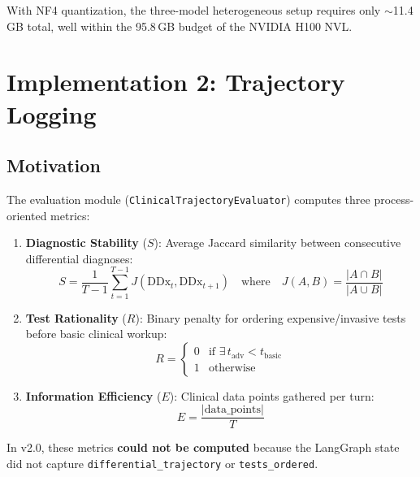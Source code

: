 \documentclass[12pt, a4paper]{article}
\begin{document}
With NF4 quantization, the three-model heterogeneous setup requires only
$\sim$11.4\,GB total, well within the 95.8\,GB budget of the NVIDIA H100 NVL.

\section{Implementation 2: Trajectory Logging}
\label{sec:trajectory}

\subsection{Motivation}

The evaluation module (\texttt{ClinicalTrajectoryEvaluator}) computes three
process-oriented metrics:

\begin{enumerate}
    \item \textbf{Diagnostic Stability} ($S$): Average Jaccard similarity
    between consecutive differential diagnoses:
    \begin{equation}
        S = \frac{1}{T-1} \sum_{t=1}^{T-1} J(\text{DDx}_t, \text{DDx}_{t+1})
        \quad\text{where}\quad J(A,B) = \frac{|A \cap B|}{|A \cup B|}
    \end{equation}

    \item \textbf{Test Rationality} ($R$): Binary penalty for ordering
    expensive/invasive tests before basic clinical workup:
    \begin{equation}
        R = \begin{cases} 0 & \text{if } \exists\, t_{\text{adv}} < t_{\text{basic}} \\ 1 & \text{otherwise} \end{cases}
    \end{equation}

    \item \textbf{Information Efficiency} ($E$): Clinical data points
    gathered per turn:
    \begin{equation}
        E = \frac{|\text{data\_points}|}{T}
    \end{equation}
\end{enumerate}

In v2.0, these metrics \textbf{could not be computed} because the LangGraph
state did not capture \texttt{differential\_trajectory} or \texttt{tests\_ordered}.
\end{document}
